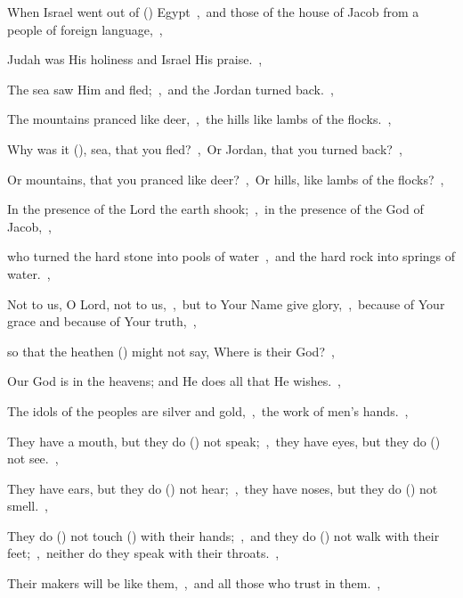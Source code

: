 \documentclass[12pt,twoside,a5paper]{article}
\begin{document}
\begin{normalparskip}
  When Israel went out of () Egypt~\sep\ and those of the house of Jacob from a people of foreign language,~\sep


  Judah was His holiness and Israel His praise.~\sep

  The sea saw Him and fled;~\sep\ and the Jordan turned back.~\sep

  The mountains pranced like deer,~\sep\ the hills like lambs of the flocks.~\sep

  Why was it (), sea, that you fled?~\sep\ Or Jordan, that you turned back?~\sep

  Or mountains, that you pranced like deer?~\sep\ Or hills, like lambs of the flocks?~\sep

  In the presence of the Lord the earth shook;~\sep\ in the presence of the God of Jacob,~\sep

  who turned the hard stone into pools of water~\sep\ and the hard rock into springs of water.~\sep

  Not to us, O Lord, not to us,~\sep\ but to Your Name give glory,~\sep\ because of Your grace and because of Your truth,~\sep

  so that the heathen () might not say, Where is their God?~\sep

  Our God is in the heavens; and He does all that He wishes.~\sep

  The idols of the peoples are silver and gold,~\sep\ the work of men's hands.~\sep

  They have a mouth, but they do () not speak;~\sep\ they have eyes, but they do () not see.~\sep

  They have ears, but they do () not hear;~\sep\ they have noses, but they do () not smell.~\sep

  They do () not touch () with their hands;~\sep\ and they do () not walk with their feet;~\sep\ neither do they speak with their throats.~\sep

  Their makers will be like them,~\sep\ and all those who trust in them.~\sep


\end{normalparskip}
\end{document}
